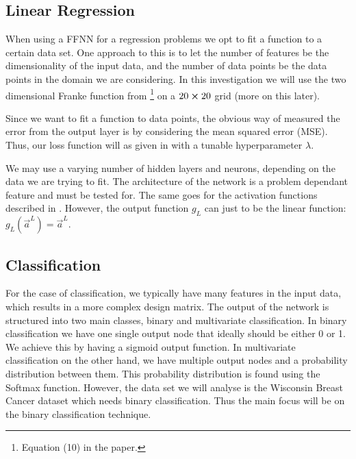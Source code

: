 \subsection{Linear Regression}\label{sec:regression}
    When using a FFNN for a regression problems we opt to fit a function to a certain data set. One approach to this is to let the number of features be the dimensionality of the input data, and the number of data points be the data points in the domain we are considering. In this investigation we will use the two dimensional Franke function from \projectOne\footnote{Equation (10) in the paper.} on a $20\cross 20$ grid (more on this later).
    
    Since we want to fit a function to data points, the obvious way of measured the error from the output layer is by considering the mean squared error (MSE). Thus, our loss function will as given in  with a tunable hyperparameter $\lambda$. 

    We may use a varying number of hidden layers and neurons, depending on the data we are trying to fit. The architecture of the network is a problem dependant feature and must be tested for. The same goes for the activation functions described in . However, the output function $g_L$ can just to be the linear function: $g_L(\vec{a}^L) = \vec{a}^{L}$. 
    
    

\subsection{Classification}\label{sec:classification}
    For the case of classification, we typically have many features in the input data, which results in a more complex design matrix. The output of the network is structured into two main classes, binary and multivariate classification. In binary classification we have one single output node that ideally should be either 0 or 1. We achieve this by having a sigmoid output function. In multivariate classification on the other hand, we have multiple output nodes and a probability distribution between them. This probability distribution is found using the Softmax function. However, the data set we will analyse is the Wisconsin Breast Cancer dataset \citep{scikit-learn} which needs binary classification. Thus the main focus will be on the binary classification technique. 

